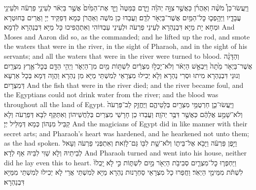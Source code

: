 {וַיַּֽעֲשׂוּ־כֵן֩ מֹשֶׁ֨ה וְאַהֲרֹ֜ן כַּאֲשֶׁ֣ר \legarmeh  צִוָּ֣ה יְהֹוָ֗ה וַיָּ֤רֶם בַּמַּטֶּה֙ וַיַּ֤ךְ אֶת־הַמַּ֙יִם֙ אֲשֶׁ֣ר בַּיְאֹ֔ר לְעֵינֵ֣י פַרְעֹ֔ה וּלְעֵינֵ֖י עֲבָדָ֑יו וַיֵּהָ֥פְכ֛וּ כׇּל־הַמַּ֥יִם אֲשֶׁר־בַּיְאֹ֖ר לְדָֽם׃}
{וַעֲבַדוּ כֵן מֹשֶׁה וְאַהֲרֹן כְּמָא דְּפַקֵּיד יְיָ וַאֲרֵים בְּחוּטְרָא וּמְחָא יָת מַיָּא דִּבְנַהְרָא לְעֵינֵי פַרְעֹה וּלְעֵינֵי עַבְדּוֹהִי וְאִתְהֲפִיכוּ כָּל מַיָּא דִּבְנַהְרָא לִדְמָא׃}
{And Moses and Aaron did so, as the \lord\space commanded; and he lifted up the rod, and smote the waters that were in the river, in the sight of Pharaoh, and in the sight of his servants; and all the waters that were in the river were turned to blood.}{}
{וְהַדָּגָ֨ה אֲשֶׁר־בַּיְאֹ֥ר מֵ֙תָה֙ וַיִּבְאַ֣שׁ הַיְאֹ֔ר וְלֹא־יָכְל֣וּ מִצְרַ֔יִם לִשְׁתּ֥וֹת מַ֖יִם מִן־הַיְאֹ֑ר וַיְהִ֥י הַדָּ֖ם בְּכׇל־אֶ֥רֶץ מִצְרָֽיִם׃}
{וְנוּנֵי דִּבְנַהְרָא מִיתוּ וּסְרִי נַהְרָא וְלָא יְכִילוּ מִצְרָאֵי לְמִשְׁתֵּי מַיָּא מִן נַהְרָא וַהֲוָה דְּמָא בְּכָל אַרְעָא דְּמִצְרָיִם׃}
{And the fish that were in the river died; and the river became foul, and the Egyptians could not drink water from the river; and the blood was throughout all the land of Egypt.}{}
{וַיַּֽעֲשׂוּ־כֵ֛ן חַרְטֻמֵּ֥י מִצְרַ֖יִם בְּלָטֵיהֶ֑ם וַיֶּחֱזַ֤ק לֵב־פַּרְעֹה֙ וְלֹא־שָׁמַ֣ע אֲלֵהֶ֔ם כַּאֲשֶׁ֖ר דִּבֶּ֥ר יְהֹוָֽה׃
}
{וַעֲבַדוּ כֵן חָרָשֵׁי מִצְרַיִם בְּלַחֲשֵׁיהוֹן וְאִתַּקַּף לִבָּא דְּפַרְעֹה וְלָא קַבֵּיל מִנְּהוֹן כְּמָא דְּמַלֵּיל יְיָ׃}
{And the magicians of Egypt did in like manner with their secret arts; and Pharaoh’s heart was hardened, and he hearkened not unto them; as the \lord\space had spoken.}{}
{וַיִּ֣פֶן פַּרְעֹ֔ה וַיָּבֹ֖א אֶל־בֵּית֑וֹ וְלֹא־שָׁ֥ת לִבּ֖וֹ גַּם־לָזֹֽאת׃
}
{וְאִתְפְּנִי פַרְעֹה וְעָאל לְבֵיתֵיהּ וְלָא שַׁוִּי לִבֵּיהּ אַף לְדָא׃}
{And Pharaoh turned and went into his house, neither did he lay even this to heart.}{}
{וַיַּחְפְּר֧וּ כׇל־מִצְרַ֛יִם סְבִיבֹ֥ת הַיְאֹ֖ר מַ֣יִם לִשְׁתּ֑וֹת כִּ֣י לֹ֤א יָֽכְלוּ֙ לִשְׁתֹּ֔ת מִמֵּימֵ֖י הַיְאֹֽר׃}
{וַחֲפַרוּ כָל מִצְרָאֵי סַחְרָנוּת נַהְרָא מַיָּא לְמִשְׁתֵּי אֲרֵי לָא יְכִילוּ לְמִשְׁתֵּי מִמַּיָּא דִּבְנַהְרָא׃}

